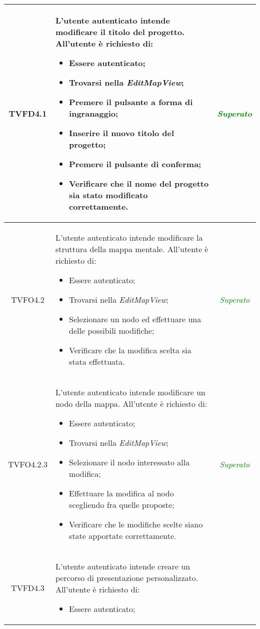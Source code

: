 \begin{longtable}{|c|>{}m{8cm}|c|}
\hypertarget{TVFD4.1}{TVFD4.1} & L'utente autenticato intende modificare il titolo del progetto.
All'utente è richiesto di:
\begin{itemize}
	\item Essere autenticato;
\item Trovarsi nella \textit{EditMapView};
	\item Premere il pulsante a forma di ingranaggio;
	\item Inserire il nuovo titolo del progetto;
	\item Premere il pulsante di conferma; 
	\item Verificare che il nome del progetto sia stato modificato correttamente.
\end{itemize} & \textcolor{Green}{\textit{Superato}}\\ \hline
\hypertarget{TVFO4.2}{TVFO4.2} & L'utente autenticato intende modificare la struttura della mappa mentale.
All'utente è richiesto di:
\begin{itemize}
	\item Essere autenticato;
	\item Trovarsi nella \textit{EditMapView};
	\item Selezionare un nodo ed effettuare una delle possibili modifiche;
	\item Verificare che la modifica scelta sia stata effettuata.
\end{itemize} & \textcolor{Green}{\textit{Superato}}\\ \hline
\hypertarget{TVFO4.2.3}{TVFO4.2.3} & L'utente autenticato intende modificare un nodo della mappa.
All'utente è richiesto di:
\begin{itemize}
	\item Essere autenticato;
	\item Trovarsi nella \textit{EditMapView};
	\item Selezionare il nodo interessato alla modifica;
	\item Effettuare la modifica al nodo scegliendo fra quelle proposte;
	\item Verificare che le modifiche scelte siano state apportate correttamente.
\end{itemize} & \textcolor{Green}{\textit{Superato}}\\ \hline
\hypertarget{TVFD4.3}{TVFD4.3} &  L'utente autenticato intende creare un percorso di presentazione personalizzato.
All'utente è richiesto di:
\begin{itemize}
	\item Essere autenticato;

\end{itemize}
\end{longtable}

